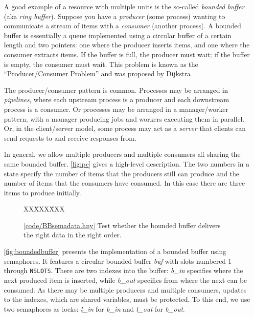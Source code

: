 \documentclass{report}
\newcommand{\harmonysource}[1]{
\begin{tabbing}
XX\=XXX\=XXX\kill
    
\end{tabbing}
}
\newcommand{\harmonylink}[1]{%
[\href{https://www.cs.cornell.edu/home/rvr/harmony/#1}{\underline{#1}}]%
}
\newenvironment{code}{
\tcolorbox
}{
\endtcolorbox
}
\begin{document}
A good example of a resource with multiple units is the
so-called \emph{bounded buffer} (aka \emph{ring buffer}).
%
Suppose you have a \emph{producer} (some process) wanting to
communicate a stream of items with a \emph{consumer} (another process).
A bounded buffer is essentially
a queue implemented using a circular buffer
%
of a certain length and two pointers:
one where the producer inserts items, and one where the consumer extracts
items.  If the
buffer is full, the producer must wait; if the buffer is empty, the
consumer must wait.
This problem is known as the ``Producer/Consumer Problem'' and was
proposed by Dijkstra~\cite{EWD329}.

The producer/consumer pattern is common.  Processes may be arranged
in \emph{pipelines},
%
where each upstream process is a producer and each downstream
process is a consumer.
Or processes may be arranged in a manager/worker pattern, with a manager
producing jobs and workers executing them in parallel.
Or, in the client/server model,
%
some process may act as a \emph{server} that clients can send requests to
and receive responses from.

In general, we allow multiple producers and multiple consumers
all sharing the same bounded buffer.
\autoref{fig:pc} gives a high-level description.  The
two numbers in a state specify
the number of items that the producers still can produce and
the number of items that the consumers have consumed.  In this case
there are three items to produce initially.

\begin{figure}
\begin{code}
\harmonysource{BBsemadata}
\end{code}
\caption{\harmonylink{code/BBsemadata.hny} Test whether the bounded buffer delivers the right data in the
right order.}
\label{fig:BBsemadata}
\end{figure}

\autoref{fig:boundedbuffer} presents the implementation of a bounded
buffer using semaphores.  It features a circular bounded buffer \textit{buf} with
slots numbered 1 through \texttt{NSLOTS}.  There are two indexes into
the buffer: \textit{b\_in} specifies where the next produced item is inserted,
while \textit{b\_out} specifies from where the next can be consumed.
As there may be multiple producers and multiple
consumers, updates to the indexes, which are shared variables, must be protected.
To this end, we use two semaphores as locks: \textit{l\_in} for \textit{b\_in}
and \textit{l\_out} for \textit{b\_out}.
\end{document}

